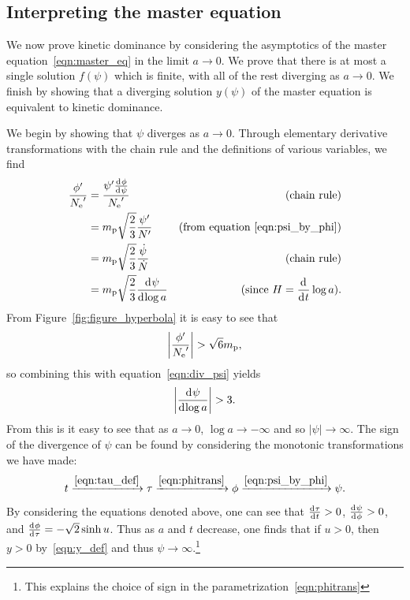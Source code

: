 \subsection{Interpreting the master equation}
\label{sec:interpreting_the_master_equation}

We now prove kinetic dominance by considering the asymptotics of the master equation~\eqref{eqn:master_eq} in the limit $a\rightarrow0$. We prove that there is at most a single solution $f(\psi)$ which is finite, with all of the rest diverging as $a\rightarrow0$. We finish by showing that a diverging solution $y(\psi)$ of the master equation is equivalent to kinetic dominance.

We begin by showing that $\psi$ diverges as $a\rightarrow0$. Through elementary derivative transformations with the chain rule and the definitions of various variables, we find
%
\begin{align}
  \frac{{{\phi}^\prime}}{{{N_\mathrm{e}}^\prime}} 
  &=
  \frac{{{\psi}^\prime}\frac{\operatorname{d}^{}\!{\phi}}{\operatorname{d}^{}\!{\psi}}}{{{N_\mathrm{e}}^\prime}}
  &\text{(chain rule)} 
  \nonumber
  \\
  &=
  m_{\mathrm{p}}\sqrt{\frac{2}{3}}\frac{{{\psi}^\prime}}{{{N}^\prime}}  
  &\text{(from equation \protect\ref{eqn:psi_by_phi})} 
  \nonumber
  \\
  &=
  m_{\mathrm{p}}\sqrt{\frac{2}{3}}\frac{\dot\psi}{\dot{N}}  
  &\text{(chain rule)} 
  \nonumber
  \\
  &=
  m_{\mathrm{p}}\sqrt{\frac{2}{3}}\frac{\operatorname{d}^{}\!{\psi}}{\operatorname{d}^{}\!{\log a}}
  &\text{(since $H=\frac{\operatorname{d}^{}\!{}}{\operatorname{d}^{}\!{t}}\log a$)}.
  \label{eqn:div_psi}
\end{align}
%
From Figure~\ref{fig:figure_hyperbola} it is easy to see that
%
\begin{equation}
  \left|\frac{{{\phi}^\prime}}{{{N_\mathrm{e}}^\prime}}\right| > \sqrt{6}m_{\mathrm{p}}, 
\end{equation}
%
so combining this with equation~\eqref{eqn:div_psi} yields
%
\begin{equation}
  \left|\frac{\operatorname{d}^{}\!{\psi}}{\operatorname{d}^{}\!{\log a}}\right| > 3. 
\end{equation}
%
From this is it easy to see that as $a\to0$, $\log a\to-\infty$ and so $|\psi|\to\infty$. The sign of the divergence of $\psi$ can be found by considering the monotonic transformations we have made: %
\begin{equation}
  t
  \xrightarrow{\protect\eqref{eqn:tau_def}}
  \tau
  \xrightarrow{\protect\eqref{eqn:phitrans}}
  \phi
  \xrightarrow{\protect\eqref{eqn:psi_by_phi}}
  \psi.
\end{equation}
%
By considering the equations denoted above, one can see that $\frac{\operatorname{d}^{}\!{\tau}}{\operatorname{d}^{}\!{t}}>0$, $\frac{\operatorname{d}^{}\!{\psi}}{\operatorname{d}^{}\!{\phi}}>0$, and $\frac{\operatorname{d}^{}\!{\phi}}{\operatorname{d}^{}\!{\tau}} = -\sqrt{2}\sinh u$. Thus as $a$ and $t$ decrease, one finds that if $u>0$, then $y>0$ by~\eqref{eqn:y_def} and thus $\psi\to\infty$.\footnote{This explains the choice of sign in the parametrization~\protect\eqref{eqn:phitrans}}




